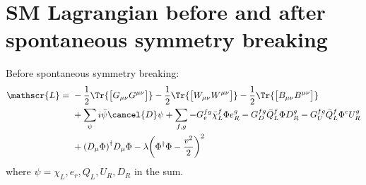 \section{SM Lagrangian before and after spontaneous symmetry breaking}
Before spontaneous symmetry breaking:
\begin{align}
  \mathscr{L} = &~-\frac{1}{2}\Tr{\big[G_{\mu\nu}G^{\mu\nu}\big]} 
  -\frac{1}{2}\Tr{\big[W_{\mu\nu}W^{\mu\nu}\big]}
  -\frac{1}{2}\Tr{\big[B_{\mu\nu}B^{\mu\nu}\big]} \\
  &~+ \sum_{\psi} i\bar{\psi}\cancel{D}\psi + \sum_{f,g} -G^{fg}_{e}\bar{\chi}^{f}_{L}
  \Phi e^{g}_{R} - G_{D}^{fg}\bar{Q}_{L}^{f}\Phi D^{g}_{R} - G^{fg}_{U}\bar{Q}_{L}^{f}\Phi^{c}U^{g}_{R} \\
  &~+{(D_{\mu}\Phi)}^{\dagger}D_{\mu}\Phi - \lambda{\bigg( \Phi^{\dagger}\Phi -
    \frac{v^{2}}{2} \bigg)}^{2}
\end{align}
where $\psi= \chi_{L}, e_{r}, Q_{L}, U_{R}, D_{R}$ in the sum.

